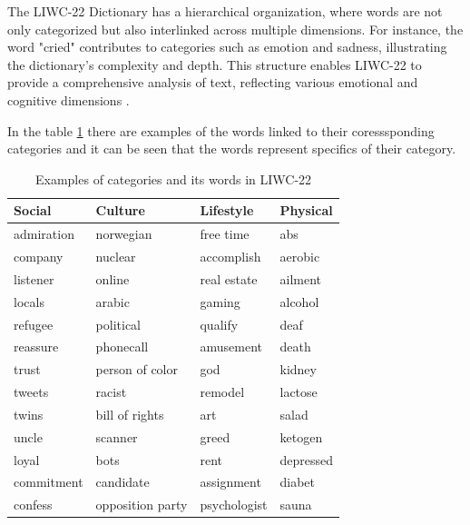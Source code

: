 The LIWC-22 Dictionary has a hierarchical organization, where words are not only categorized but also interlinked across multiple dimensions. For instance, the word "cried" contributes to categories such as emotion and sadness, illustrating the dictionary's complexity and depth. This structure enables LIWC-22 to provide a comprehensive analysis of text, reflecting various emotional and cognitive dimensions \cite{boyd2022development}.

In the table \ref{examplesLIWC22Dic} there are examples of the words linked to their coresssponding categories and it can be seen that the words represent specifics of their category. 

\begin{table}[ht]
\centering
\begin{tabular}{llll}
\hline
\textbf{Social} & \textbf{Culture} & \textbf{Lifestyle} & \textbf{Physical} \\ \hline
admiration & norwegian & free time & abs \\
company & nuclear & accomplish & aerobic\\
listener & online & real estate & ailment\\
locals & arabic & gaming & alcohol\\
refugee & political & qualify & deaf\\
reassure & phonecall & amusement &  death\\
trust & person of color & god &  kidney\\
tweets & racist &  remodel &  lactose\\
twins & bill of rights & art & salad\\
uncle & scanner & greed & ketogen\\
loyal & bots & rent &  depressed\\
commitment & candidate & assignment &  diabet\\
confess & opposition party & psychologist & sauna\\ \hline
\end{tabular}
\caption{Examples of categories and its words in LIWC-22}
\label{examplesLIWC22Dic}
\end{table}



